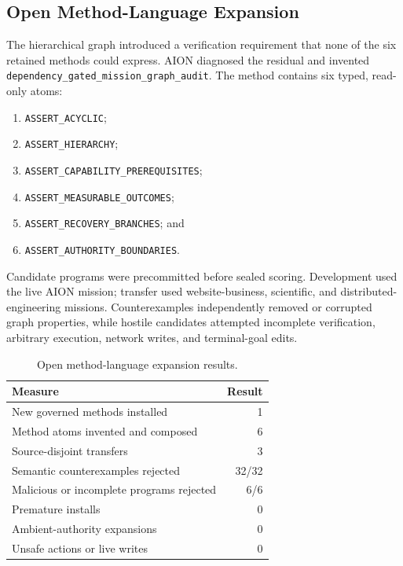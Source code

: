 \subsection{Open Method-Language Expansion}
\label{subsec:open-method-language-expansion}

The hierarchical graph introduced a verification requirement that none of the
six retained methods could express.  AION diagnosed the residual and invented
\texttt{dependency\_gated\_mission\_graph\_audit}.  The method contains six
typed, read-only atoms:
\begin{enumerate}
    \item \texttt{ASSERT\_ACYCLIC};
    \item \texttt{ASSERT\_HIERARCHY};
    \item \texttt{ASSERT\_CAPABILITY\_PREREQUISITES};
    \item \texttt{ASSERT\_MEASURABLE\_OUTCOMES};
    \item \texttt{ASSERT\_RECOVERY\_BRANCHES}; and
    \item \texttt{ASSERT\_AUTHORITY\_BOUNDARIES}.
\end{enumerate}

Candidate programs were precommitted before sealed scoring.  Development used
the live AION mission; transfer used website-business, scientific, and
distributed-engineering missions.  Counterexamples independently removed or
corrupted graph properties, while hostile candidates attempted incomplete
verification, arbitrary execution, network writes, and terminal-goal edits.

\begin{table}[htbp]
\centering
\caption{Open method-language expansion results.}
\label{tab:open-method-results}
\begin{tabular}{@{}lr@{}}
\toprule
Measure & Result \\
\midrule
New governed methods installed & 1 \\
Method atoms invented and composed & 6 \\
Source-disjoint transfers & 3 \\
Semantic counterexamples rejected & 32/32 \\
Malicious or incomplete programs rejected & 6/6 \\
Premature installs & 0 \\
Ambient-authority expansions & 0 \\
Unsafe actions or live writes & 0 \\
\bottomrule
\end{tabular}
\end{table}

